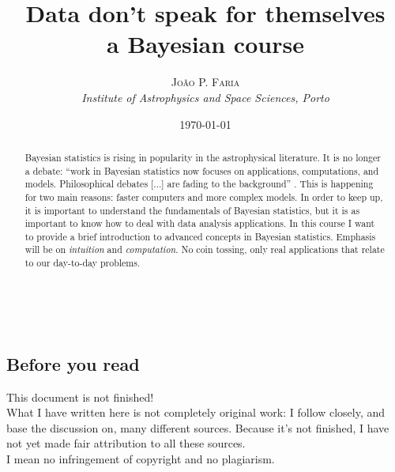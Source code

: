 \documentclass[a4paper,11pt]{article}
\title{\textbf{Data don't speak for themselves}\\ %
a Bayesian course} %
\author{\textsc{João P. Faria} %
\\{\textit{Institute of Astrophysics and Space Sciences, Porto}}} %
\date{\today} %
\makeatletter
\renewcommand{\maketitle}{ %
\begin{flushright} %
{\LARGE\@title} %

\vspace{50pt} %

{\large\@author} %
\\\@date %

\vspace{40pt} %
\end{flushright}
}
\makeatother
\begin{document}
\maketitle %



\begin{abstract}
Bayesian statistics is rising in popularity in the astrophysical literature. 
It is no longer a debate: ``work in Bayesian statistics now focuses on applications, computations, and models. Philosophical debates [...] are fading to the background'' \cite{Gelman2014}. 
This is happening for two main reasons: faster computers and more complex models. 
In order to keep up, it is important to understand the fundamentals of Bayesian statistics, but it is as important to know how to deal with data analysis applications. 
In this course I want to provide a brief introduction to advanced concepts in Bayesian statistics.
Emphasis will be on \emph{intuition} and \emph{computation}.
No coin tossing, only real applications that relate to our day-to-day problems. 
\end{abstract}


\vspace{30pt} %

\tableofcontents


\newpage
\begin{center}
  \section*{Before you read}
  
  This document is not finished! \\
  What I have written here is not completely original work: I follow closely, and base the discussion on, many different sources. 
  Because it's not finished, I have not yet made fair attribution to all these sources.\\[0.2in]
  I mean no infringement of copyright and no plagiarism.
\end{center}
\end{document}
